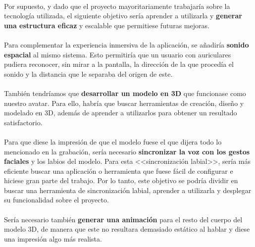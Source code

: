 \documentclass{subfiles}
\begin{document}
        \paragraph{}
        {Por supuesto, y dado que el proyecto mayoritariamente trabajaría sobre la tecnología utilizada, el siguiente objetivo sería aprender a utilizarla y \textbf{generar una estructura eficaz} y escalable que permitiese futuras mejoras.}

        \paragraph{}
        {Para complementar la experiencia inmersiva de la aplicación, se añadiría \textbf{sonido espacial} al mismo sistema. Esto permitiría que un usuario con auriculares pudiera reconocer, sin mirar a la pantalla, la dirección de la que procedía el sonido y la distancia que le separaba del origen de este.}
        
        \paragraph{}
        {También tendríamos que \textbf{desarrollar un modelo en 3D} que funcionase como nuestro avatar. Para ello, habría que buscar herramientas de creación, diseño y modelado en 3D, además de aprender a utilizarlos para obtener un resultado satisfactorio.}
        
        \paragraph{}
        {Para que diese la impresión de que el modelo fuese el que dijera todo lo mencionado en la grabación, sería necesario \textbf{sincronizar la voz con los gestos faciales} y los labios del modelo. Para esta <<sincronización labial>>, sería más eficiente buscar una aplicación o herramienta que fuese fácil de configurar e hiciese gran parte del trabajo. Por lo tanto, este objetivo se podría dividir en buscar una herramienta de sincronización labial, aprender a utilizarla y desplegar su funcionalidad sobre el proyecto.}
        
        \paragraph{}
        {Sería necesario también \textbf{generar una animación} para el resto del cuerpo del modelo 3D, de manera que este no resultara demasiado estático al hablar y diese una impresión algo más realista.}
        
\end{document}
